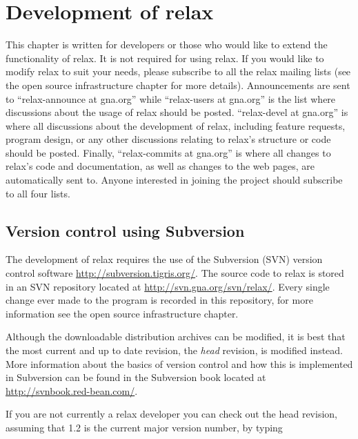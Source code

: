 
\chapter{Development of relax}

This chapter is written for developers or those who would like to extend the functionality of relax.  It is not required for using relax.  If you would like to modify relax to suit your needs, please subscribe to all the relax mailing lists (see the open source infrastructure chapter for more details).  Announcements are sent to ``relax-announce at gna.org'' while ``relax-users at gna.org'' is the list where discussions about the usage of relax should be posted.  ``relax-devel at gna.org'' is where all discussions about the development of relax, including feature requests, program design, or any other discussions relating to relax's structure or code should be posted.  Finally, ``relax-commits at gna.org'' is where all changes to relax's code and documentation, as well as changes to the web pages, are automatically sent to.  Anyone interested in joining the project should subscribe to all four lists.




\section{Version control using Subversion}

The development of relax requires the use of the Subversion (SVN) version control software \href{http://subversion.tigris.org/}{http://subversion.tigris.org/}.  The source code to relax is stored in an SVN repository located at \href{http://svn.gna.org/svn/relax/}{http://svn.gna.org/svn/relax/}.  Every single change ever made to the program is recorded in this repository, for more information see the open source infrastructure chapter.

Although the downloadable distribution archives can be modified, it is best that the most current and up to date revision, the \textit{head} revision, is modified instead.  More information about the basics of version control and how this is implemented in Subversion can be found in the Subversion book located at \href{http://svnbook.red-bean.com/}{http://svnbook.red-bean.com/}.

If you are not currently a relax developer you can check out the head revision, assuming that 1.2 is the current major version number, by typing

